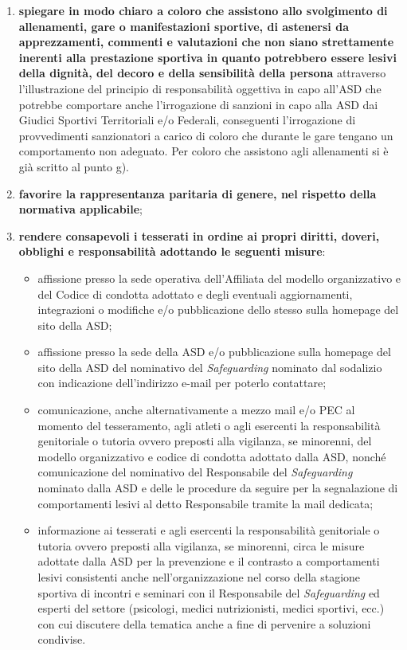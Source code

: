 \documentclass{djtsasddoc}
\begin{document}
\begin{enumerate}
\begin{enumerate}
			\item \textbf{spiegare in modo chiaro a coloro che assistono allo svolgimento di allenamenti, gare o manifestazioni sportive, di astenersi da apprezzamenti, commenti e valutazioni che non siano strettamente inerenti alla prestazione sportiva in quanto potrebbero essere lesivi della dignità, del decoro e della sensibilità della persona} attraverso l'illustrazione del principio di responsabilità oggettiva in capo all'ASD che potrebbe comportare anche l'irrogazione di sanzioni in capo alla ASD dai Giudici Sportivi Territoriali e/o Federali, conseguenti l'irrogazione di provvedimenti sanzionatori a carico di coloro che durante le gare tengano un comportamento non adeguato. Per coloro che assistono agli allenamenti si è già scritto al punto g).
			\item \textbf{favorire la rappresentanza paritaria di genere, nel rispetto della normativa applicabile};
			\item \textbf{rendere consapevoli i tesserati in ordine ai propri diritti, doveri, obblighi e responsabilità adottando le seguenti misure}:
			\begin{itemize}
				\item affissione presso la sede operativa dell'Affiliata del modello organizzativo e del Codice di condotta adottato e degli eventuali aggiornamenti, integrazioni o modifiche e/o pubblicazione dello  stesso sulla homepage del sito della ASD;
				\item affissione presso la sede della ASD e/o pubblicazione sulla homepage del sito della ASD del nominativo del \textit{Safeguarding} nominato dal sodalizio con indicazione dell'indirizzo e-mail per poterlo contattare;
				\item comunicazione, anche alternativamente a mezzo mail e/o PEC al momento del tesseramento, agli atleti o agli esercenti la responsabilità genitoriale o tutoria ovvero preposti alla vigilanza, se minorenni, del modello organizzativo e codice di condotta adottato dalla ASD, nonché comunicazione del nominativo del Responsabile del \textit{Safeguarding} nominato dalla ASD e delle le procedure da seguire per la segnalazione di comportamenti lesivi al detto Responsabile tramite la mail dedicata; 
				\item informazione ai tesserati e agli esercenti la responsabilità genitoriale o tutoria ovvero preposti alla vigilanza, se minorenni, circa le misure adottate dalla ASD per la prevenzione e il contrasto a comportamenti lesivi consistenti anche nell'organizzazione nel corso della stagione sportiva di incontri e seminari  con il Responsabile del \textit{Safeguarding} ed esperti del settore (psicologi, medici nutrizionisti, medici sportivi, ecc.) con cui discutere della tematica anche a fine di pervenire a soluzioni condivise.

\end{itemize}
\end{enumerate}
\end{enumerate}
\end{document}
